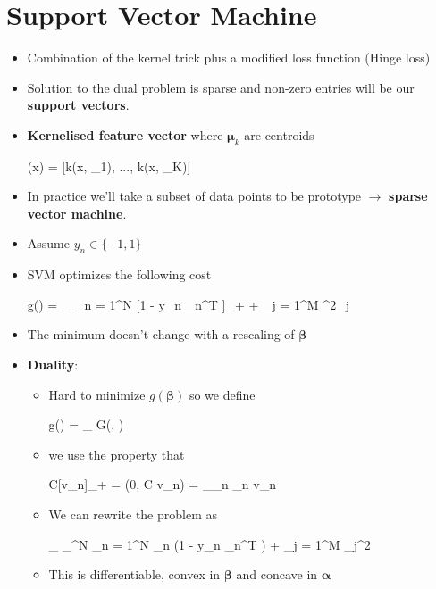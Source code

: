 \section{Support Vector Machine} 
\begin{itemize}
	\item Combination of the kernel trick plus a modified loss function (Hinge loss)
	\item Solution to the dual problem is sparse and non-zero entries will be our \textbf{support vectors}.
	\item \textbf{Kernelised feature vector} where $\bm \mu_k$ are centroids
	\begin{myalign*}
	    \bm \phi(\*x) = [k(\*x, \bm \mu_1), ..., k(\*x, \bm \mu_K)]
	\end{myalign*}
	\item In practice we'll take a subset of data points to be prototype $\rightarrow$ \textbf{sparse vector machine}.
	\item Assume $y_n \in \{-1, 1\}$
	\item SVM optimizes the following cost
	\begin{myalign*}
	    g(\bm \beta) = \min_{\bm \beta} \sum_{n = 1}^N [1 - y_n \tilde{\bm \phi}_n^T \bm \beta]_+ +  \sum_{j = 1}^M \beta^2_j
	\end{myalign*}
	\item The minimum doesn't change with a rescaling of $\bm \beta$
	\item \textbf{Duality}:
	\begin{itemize}
		\item Hard to minimize $g(\bm \beta)$ so we define
		\begin{myalign*}
		    g(\bm \beta) = \max_{\bm \alpha} G(\bm \beta, \bm \alpha)
		\end{myalign*}
		\item we use the property that
		\begin{myalign*}
		    C[v_n]_+ = \max(0, C v_n) = \max_{\alpha_n \in [0, C]} \alpha_n v_n
		\end{myalign*}
		\item We can rewrite the problem as
		\begin{myalign*}
		    \min_{\bm \beta} \max_{\bm \alpha \in [0, C]^N} \sum_{n = 1}^N \alpha_n (1 - y_n \tilde{\bm \phi}_n^T \bm \beta) +  \sum_{j = 1}^M \beta_j^2
		\end{myalign*}
		\item This is differentiable, convex in $\bm \beta$ and concave in $\bm \alpha$

\end{itemize}
\end{itemize}
